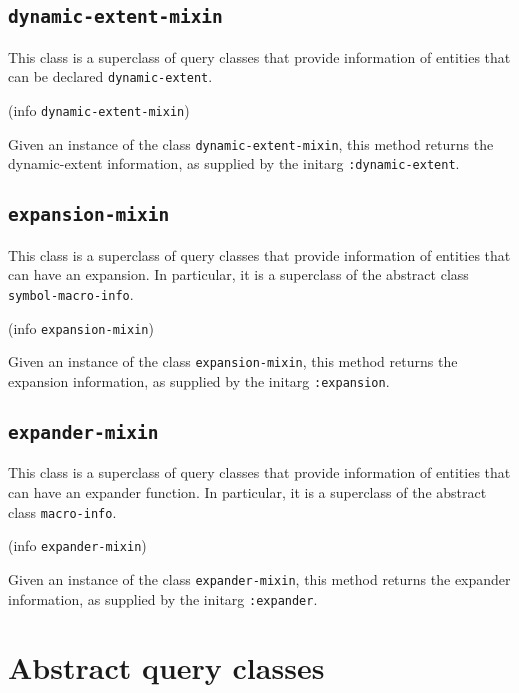 \subsection{\texttt{dynamic-extent-mixin}}


This class is a superclass of query classes that provide information
of entities that can be declared \texttt{dynamic-extent}.


 {(info {\tt dynamic-extent-mixin})}

Given an instance of the class \texttt{dynamic-extent-mixin}, this method
returns the dynamic-extent information, as supplied by the initarg
\texttt{:dynamic-extent}.

\subsection{\texttt{expansion-mixin}}

This class is a superclass of query classes that provide information
of entities that can have an expansion.  In particular, it is a
superclass of the abstract class \texttt{symbol-macro-info}.


 {(info {\tt expansion-mixin})}

Given an instance of the class \texttt{expansion-mixin}, this method
returns the expansion information, as supplied by the initarg
\texttt{:expansion}.

\subsection{\texttt{expander-mixin}}

This class is a superclass of query classes that provide information
of entities that can have an expander function.  In particular, it is
a superclass of the abstract class \texttt{macro-info}.


 {(info {\tt expander-mixin})}

Given an instance of the class \texttt{expander-mixin}, this method
returns the expander information, as supplied by the initarg
\texttt{:expander}.

\section{Abstract query classes}

